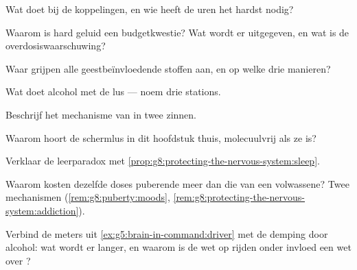 \begin{exercise}[$\star$]\label{exo:g8:protecting-the-nervous-system:1}
Wat doet  bij de koppelingen, en wie heeft de uren het hardst nodig?
\end{exercise}

\begin{exercise}[$\star$]\label{exo:g8:protecting-the-nervous-system:2}
Waarom is hard geluid een budgetkwestie? Wat wordt er uitgegeven, en wat is
de overdosiswaarschuwing?
\end{exercise}

\begin{exercise}[$\star$]\label{exo:g8:protecting-the-nervous-system:3}
Waar grijpen alle geestbeïnvloedende stoffen aan, en op welke drie
manieren?
\end{exercise}

\begin{exercise}[$\star$]\label{exo:g8:protecting-the-nervous-system:4}
Wat doet alcohol met de lus --- noem drie stations.
\end{exercise}

\begin{exercise}[$\star$]\label{exo:g8:protecting-the-nervous-system:5}
Beschrijf het mechanisme van  in twee zinnen.
\end{exercise}

\begin{exercise}[$\star$]\label{exo:g8:protecting-the-nervous-system:6}
Waarom hoort de schermlus in dit hoofdstuk thuis, molecuulvrij als ze is?
\end{exercise}

\begin{exercise}[$\star\star$]\label{exo:g8:protecting-the-nervous-system:7}
Verklaar de leerparadox met
\cref{prop:g8:protecting-the-nervous-system:sleep}.
\end{exercise}

\begin{exercise}[$\star\star$]\label{exo:g8:protecting-the-nervous-system:8}
Waarom kosten dezelfde doses puberende  meer dan die van een
volwassene? Twee mechanismen
(\cref{rem:g8:puberty:moods},
\cref{rem:g8:protecting-the-nervous-system:addiction}).
\end{exercise}

\begin{exercise}[$\star\star$]\label{exo:g8:protecting-the-nervous-system:9}
Verbind de meters uit \cref{ex:g5:brain-in-command:driver} met de demping
door alcohol: wat wordt er langer, en waarom is de wet op rijden onder
invloed een wet over ?
\end{exercise}

